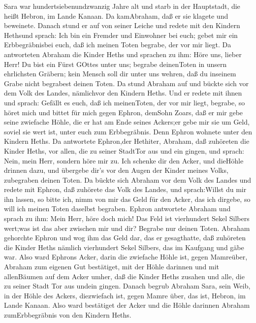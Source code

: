 Sara war hundertsiebenundzwanzig Jahre alt  und
starb in der Hauptstadt, die heißt Hebron, im Lande Kanaan. Da
kamAbraham, daß er sie klagete und beweinete.  Danach stund
er auf von seiner Leiche und redete mit den Kindern Hethsund sprach:
 Ich bin ein Fremder und Einwohner bei euch; gebet mir ein
Erbbegräbnisbei euch, daß ich meinen Toten begrabe, der vor mir liegt.
 Da antworteten Abraham die Kinder Heths und sprachen zu
ihm:  Höre uns, lieber Herr! Du bist ein Fürst GOttes unter
uns; begrabe deinenToten in unsern ehrlichsten Gräbern; kein Mensch soll
dir unter uns wehren, daß du inseinem Grabe nicht begrabest deinen
Toten.  Da stund Abraham auf und bückte sich vor dem Volk
des Landes, nämlichvor den Kindern Heths.  Und er redete mit
ihnen und sprach: Gefällt es euch, daß ich meinenToten, der vor mir
liegt, begrabe, so höret mich und bittet für mich gegen Ephron, demSohn
Zoars,  daß er mir gebe seine zwiefache Höhle, die er hat am
Ende seines Ackers;er gebe mir sie um Geld, soviel sie wert ist, unter
euch zum Erbbegräbnis.  Denn Ephron wohnete unter den
Kindern Heths. Da antwortete Ephron,der Hethiter, Abraham, daß zuhöreten
die Kinder Heths, vor allen, die zu seiner StadtTor aus und ein gingen,
und sprach:  Nein, mein Herr, sondern höre mir zu. Ich
schenke dir den Acker, und dieHöhle drinnen dazu, und übergebe dir's vor
den Augen der Kinder meines Volks, zubegraben deinen Toten.
 Da bückte sich Abraham vor dem Volk des Landes
 und redete mit Ephron, daß zuhörete das Volk des Landes,
und sprach:Willst du mir ihn lassen, so bitte ich, nimm von mir das Geld
für den Acker, das ich dirgebe, so will ich meinen Toten daselbst
begraben.  Ephron antwortete Abraham und sprach zu ihm:
 Mein Herr, höre doch mich! Das Feld ist vierhundert Sekel
Silbers wert;was ist das aber zwischen mir und dir? Begrabe nur deinen
Toten.  Abraham gehorchte Ephron und wog ihm das Geld dar,
das er gesagthatte, daß zuhöreten die Kinder Heths nämlich vierhundert
Sekel Silbers, das im Kaufgang und gäbe war.  Also ward
Ephrons Acker, darin die zwiefache Höhle ist, gegen Mamreüber, Abraham
zum eigenen Gut bestätiget, mit der Höhle darinnen und mit allenBäumen
auf dem Acker umher,  daß die Kinder Heths zusahen und
alle, die zu seiner Stadt Tor aus undein gingen.  Danach
begrub Abraham Sara, sein Weib, in der Höhle des Ackers, diezwiefach
ist, gegen Mamre über, das ist, Hebron, im Lande Kanaan. 
Also ward bestätiget der Acker und die Höhle darinnen Abraham
zumErbbegräbnis von den Kindern Heths.

